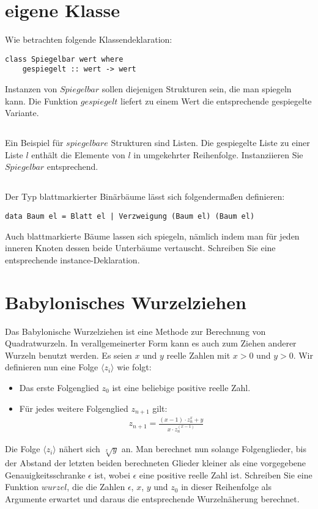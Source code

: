 \documentclass{article}
\begin{document}
\section{eigene Klasse}
Wie betrachten folgende Klassendeklaration:
\begin{lstlisting}
class Spiegelbar wert where
	gespiegelt :: wert -> wert
\end{lstlisting}
Instanzen von $Spiegelbar$ sollen diejenigen Strukturen sein, die man spiegeln kann. Die
Funktion $gespiegelt$ liefert zu einem Wert die entsprechende gespiegelte Variante.
\subsection{}
Ein Beispiel für $spiegelbare$ Strukturen sind Listen. Die gespiegelte Liste zu einer
Liste $l$ enthält die Elemente von $l$ in umgekehrter Reihenfolge. Instanziieren Sie
$Spiegelbar$ entsprechend.
\subsection{} 
Der Typ blattmarkierter Binärbäume lässt sich folgendermaßen definieren:
\begin{lstlisting}
data Baum el = Blatt el | Verzweigung (Baum el) (Baum el)
\end{lstlisting}
Auch blattmarkierte Bäume lassen sich spiegeln, nämlich indem man für jeden
inneren Knoten dessen beide Unterbäume vertauscht. Schreiben Sie eine entsprechende
instance-Deklaration.

\section{Babylonisches Wurzelziehen}
Das Babylonische Wurzelziehen ist eine Methode zur Berechnung von Quadratwurzeln.
In verallgemeinerter Form kann es auch zum Ziehen anderer Wurzeln benutzt werden.
Es seien $x$ und $y$ reelle Zahlen mit $x > 0$ und $y > 0$. Wir definieren nun eine Folge $\langle z_i \rangle$
wie folgt:
\begin{itemize}
  \item Das erste Folgenglied $z_0$ ist eine beliebige positive reelle Zahl.
  \item Für jedes weitere Folgenglied $z_{n+1}$ gilt: \\
  \begin{align*}
  z_{n+1} = \frac{(x-1) \cdot z_n^x + y}{x \cdot z_n^{(x-1)}}
  \end{align*}
\end{itemize}
Die Folge $\langle z_i \rangle$ nähert sich $\sqrt[x]{y}$ an. Man berechnet nun solange Folgenglieder, bis der
Abstand der letzten beiden berechneten Glieder kleiner als eine vorgegebene Genauigkeitsschranke
$\epsilon$ ist, wobei $\epsilon$ eine positive reelle Zahl ist. Schreiben Sie eine Funktion
$wurzel$, die die Zahlen $\epsilon$, $x$, $y$ und $z_0$ in dieser Reihenfolge als Argumente erwartet und
daraus die entsprechende Wurzelnäherung berechnet.
\end{document}
